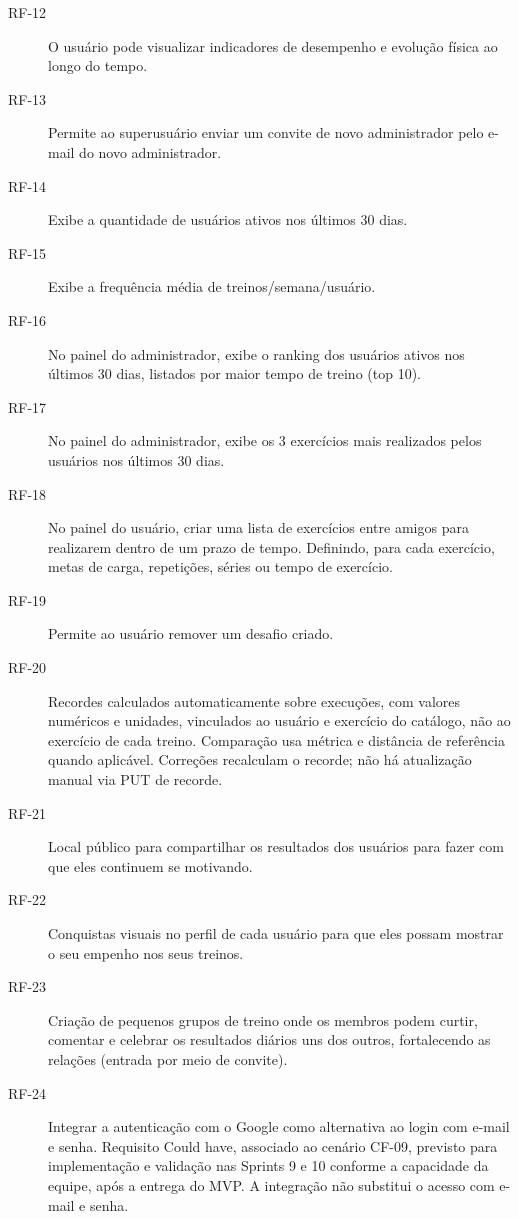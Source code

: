 \begin{description}
\item[RF-12] O usuário pode visualizar indicadores de desempenho e evolução física ao longo do tempo.

\item[RF-13] Permite ao superusuário enviar um convite de novo administrador pelo e-mail do novo administrador.

\item[RF-14] Exibe a quantidade de usuários ativos nos últimos 30 dias.

\item[RF-15] Exibe a frequência média de treinos/semana/usuário.

\item[RF-16] No painel do administrador, exibe o ranking dos usuários ativos nos últimos 30 dias, listados por maior tempo de treino (top 10).

\item[RF-17] No painel do administrador, exibe os 3 exercícios mais realizados pelos usuários nos últimos 30 dias.

\item[RF-18] No painel do usuário, criar uma lista de exercícios entre amigos para realizarem dentro de um prazo de tempo. Definindo, para cada exercício, metas de carga, repetições, séries ou tempo de exercício.

\item[RF-19] Permite ao usuário remover um desafio criado.

\item[RF-20] Recordes calculados automaticamente sobre execuções, com valores numéricos e unidades, vinculados ao usuário e exercício do catálogo, não ao exercício de cada treino. Comparação usa métrica e distância de referência quando aplicável. Correções recalculam o recorde; não há atualização manual via PUT de recorde.

\item[RF-21] Local público para compartilhar os resultados dos usuários para fazer com que eles continuem se motivando.

\item[RF-22] Conquistas visuais no perfil de cada usuário para que eles possam mostrar o seu empenho nos seus treinos.

\item[RF-23] Criação de pequenos grupos de treino onde os membros podem curtir, comentar e celebrar os resultados diários uns dos outros, fortalecendo as relações (entrada por meio de convite).

\item[RF-24] Integrar a autenticação com o Google como alternativa ao login com e-mail e senha. Requisito Could have, associado ao cenário CF-09, previsto para implementação e validação nas Sprints 9 e 10 conforme a capacidade da equipe, após a entrega do MVP. A integração não substitui o acesso com e-mail e senha.

\end{description}

